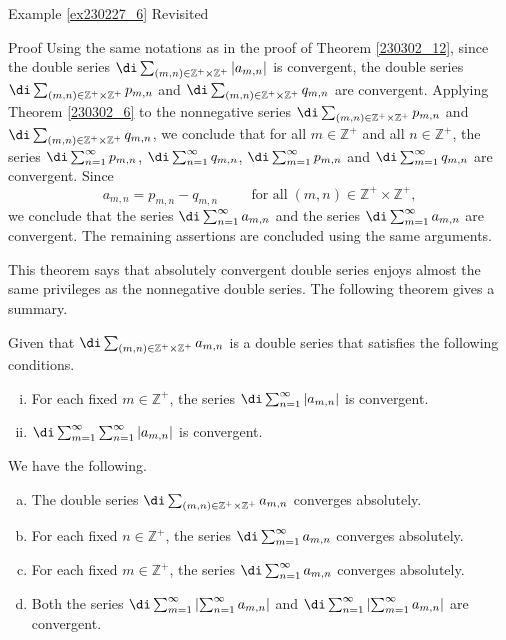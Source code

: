 \begin{example}{\linkt Example \ref{ex230227_6} Revisited}
\begin{example}[label=ex230227_13]{}
\begin{example}{}
\begin{example}[label=ex230301_6]{}
\begin{theorem}[label=230302_10]{}
\end{theorem}
\begin{myproof}{Proof}
  Using the same notations as in the proof of Theorem \ref{230302_12}, since the double series $\di\sum_{(m,n)\in\mathbb{Z}^+\times\mathbb{Z}^+}|a_{m,n}|$ is convergent, the double series $\di\sum_{(m,n)\in\mathbb{Z}^+\times\mathbb{Z}^+}p_{m,n}$ and $\di\sum_{(m,n)\in\mathbb{Z}^+\times\mathbb{Z}^+}q_{m,n}$ are convergent. Applying Theorem \ref{230302_6} to the nonnegative series $\di\sum_{(m,n)\in\mathbb{Z}^+\times\mathbb{Z}^+}p_{m,n}$ and $\di\sum_{(m,n)\in\mathbb{Z}^+\times\mathbb{Z}^+}q_{m,n}$, we conclude that for all $m\in\mathbb{Z}^+$ and all $n\in\mathbb{Z}^+$, the series
$\di \sum_{n=1}^{\infty}p_{m,n}$, $\di \sum_{n=1}^{\infty}q_{m,n}$,  $\di\sum_{m=1}^{\infty}p_{m,n}$ and $\di\sum_{m=1}^{\infty}q_{m,n}$  are convergent.  Since
\[a_{m,n}=p_{m,n}-q_{m,n}\hspace{1cm}\text{for all}\;(m,n)\in\mathbb{Z}^+\times\mathbb{Z}^+,\]
we conclude that the series
$\di \sum_{n=1}^{\infty}a_{m,n}$ and the series $\di\sum_{m=1}^{\infty}a_{m,n}$ are convergent. The remaining assertions are concluded using the same arguments.
\end{myproof}
This theorem says that absolutely convergent double series enjoys almost the same privileges as the nonnegative double series.
 The following theorem gives a summary.
\begin{theorem}{}
Given that $\di\sum_{(m,n)\in\mathbb{Z}^+\times\mathbb{Z}^+}a_{m,n}$ is a double series that satisfies the following conditions.
\begin{enumerate}[(i)]
\item
For each fixed $m\in\mathbb{Z}^+$, the series $\di\sum_{n=1}^{\infty}|a_{m,n}|$ is convergent.
\item $\di \sum_{m=1}^{\infty}\sum_{n=1}^{\infty}|a_{m,n}|$ is convergent.
\end{enumerate}
 We have the following.
\begin{enumerate}[(a)]
\item The double series $\di\sum_{(m,n)\in\mathbb{Z}^+\times\mathbb{Z}^+}a_{m,n}$ converges absolutely.
\item For each fixed $n\in\mathbb{Z}^+$, the series $\di\sum_{m=1}^{\infty}a_{m,n}$  converges absolutely.
\item For each fixed $m\in\mathbb{Z}^+$, the series $\di\sum_{n=1}^{\infty}a_{m,n}$  converges absolutely.
\item Both the series  $\di \sum_{m=1}^{\infty}\left|\sum_{n=1}^{\infty} a_{m,n}\right|$ and $\di \sum_{n=1}^{\infty}\left|\sum_{m=1}^{\infty} a_{m,n}\right|$ are convergent.

\end{enumerate}
\end{theorem}
\end{example}
\end{example}
\end{example}
\end{example}
